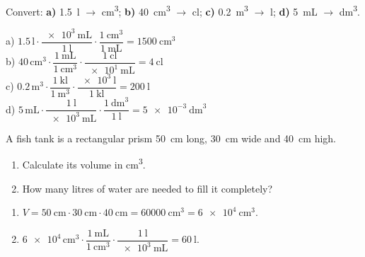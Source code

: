 \begin{exercise}
    Convert: \textbf{a)} \qty{1.5}{\litre} \(\to\) \unit{\cubic\cm}; \textbf{b)} \qty{40}{\cubic\cm} \(\to\) \unit{\centi\litre}; \textbf{c)} \qty{0.2}{\cubic\m} \(\to\) \unit{\litre}; \textbf{d)} \qty{5}{\mL} \(\to\) \unit{\cubic\dm}.
    \begin{solu}
        a) \(\num{1.5}\,\unit{\litre} \cdot \dfrac{\qty{e3}{\mL}}{\qty{1}{\litre}} \cdot \dfrac{\qty{1}{\cubic\cm}}{\qty{1}{\mL}} = \qty{1500}{\cubic\cm}\) \\
        b) \(\num{40}\,\unit{\cubic\cm} \cdot \dfrac{\qty{1}{\mL}}{\qty{1}{\cubic\cm}} \cdot \dfrac{\qty{1}{\centi\litre}}{\qty{e1}{\mL}} = \qty{4}{\centi\litre}\) \\
        c) \(\num{0.2}\,\unit{\cubic\m} \cdot \dfrac{\qty{1}{\kilo\litre}}{\qty{1}{\cubic\m}} \cdot \dfrac{\qty{e3}{\litre}}{\qty{1}{\kilo\litre}} = \qty{200}{\litre}\) \\
        d) \(\num{5}\,\unit{\mL} \cdot \dfrac{\qty{1}{\litre}}{\qty{e3}{\mL}} \cdot \dfrac{\qty{1}{\cubic\dm}}{\qty{1}{\litre}} = \qty{5e-3}{\cubic\dm}\)
    \end{solu}
\end{exercise}

\begin{exercise}
    A fish tank is a rectangular prism \qty{50}{\cm} long, \qty{30}{\cm} wide and \qty{40}{\cm} high.
    \begin{enumerate}[label=\letraminuscula]
        \item Calculate its volume in \unit{\cubic\cm}.
        \item How many litres of water are needed to fill it completely?
    \end{enumerate}
    \begin{solu}
        \begin{enumerate}[label=\alph*)]
            \item \(V = \qty{50}{\cm} \cdot \qty{30}{\cm} \cdot \qty{40}{\cm} = \qty{60000}{\cubic\cm} = \qty{6e4}{\cubic\cm}\).
            \item \(\num{6e4}\,\unit{\cubic\cm} \cdot \dfrac{\qty{1}{\mL}}{\qty{1}{\cubic\cm}} \cdot \dfrac{\qty{1}{\litre}}{\qty{e3}{\mL}} = \qty{60}{\litre}\).
        \end{enumerate}
    \end{solu}
\end{exercise}

